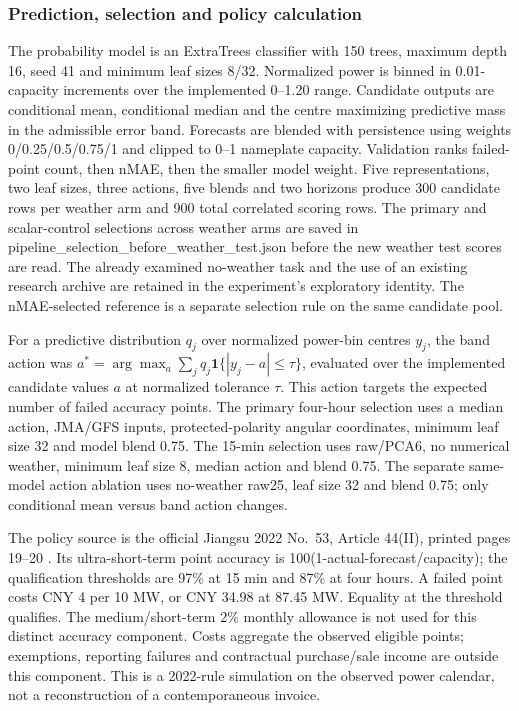 \documentclass[a4paper,11pt]{article}
\begin{document}
\subsubsection{Prediction, selection and policy calculation}\label{prediction-selection-and-policy-calculation}

The probability model is an ExtraTrees classifier with 150 trees, maximum depth 16, seed 41 and minimum leaf sizes 8/32. Normalized power is binned in 0.01-capacity increments over the implemented 0--1.20 range. Candidate outputs are conditional mean, conditional median and the centre maximizing predictive mass in the admissible error band. Forecasts are blended with persistence using weights 0/0.25/0.5/0.75/1 and clipped to 0--1 nameplate capacity. Validation ranks failed-point count, then nMAE, then the smaller model weight. Five representations, two leaf sizes, three actions, five blends and two horizons produce 300 candidate rows per weather arm and 900 total correlated scoring rows. The primary and scalar-control selections across weather arms are saved in pipeline\_selection\_before\_weather\_test.json before the new weather test scores are read. The already examined no-weather task and the use of an existing research archive are retained in the experiment's exploratory identity. The nMAE-selected reference is a separate selection rule on the same candidate pool.

For a predictive distribution \(q_j\) over normalized power-bin centres \(y_j\), the band action was \(a^*=\arg\max_a\sum_jq_j\mathbf{1}\{|y_j-a|\le\tau\}\), evaluated over the implemented candidate values \(a\) at normalized tolerance \(\tau\). This action targets the expected number of failed accuracy points. The primary four-hour selection uses a median action, JMA/GFS inputs, protected-polarity angular coordinates, minimum leaf size 32 and model blend 0.75. The 15-min selection uses raw/PCA6, no numerical weather, minimum leaf size 8, median action and blend 0.75. The separate same-model action ablation uses no-weather raw25, leaf size 32 and blend 0.75; only conditional mean versus band action changes.

The policy source is the official Jiangsu 2022 No.~53, Article 44(II), printed pages 19--20 \citep{jiangsu2022accuracy}. Its ultra-short-term point accuracy is 100(1-\textbar actual-forecast\textbar/capacity); the qualification thresholds are 97\% at 15 min and 87\% at four hours. A failed point costs CNY 4 per 10 MW, or CNY 34.98 at 87.45 MW. Equality at the threshold qualifies. The medium/short-term 2\% monthly allowance is not used for this distinct accuracy component. Costs aggregate the observed eligible points; exemptions, reporting failures and contractual purchase/sale income are outside this component. This is a 2022-rule simulation on the observed power calendar, not a reconstruction of a contemporaneous invoice.
\end{document}
